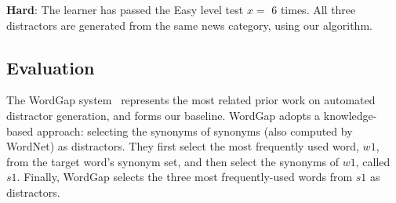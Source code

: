 {\bf Hard}: The learner has passed the Easy level test $x=$ 6
times.  All three distractors are generated from the same news
category, using our algorithm.


\subsection{Evaluation}

The WordGap system~\cite{Knoop2013} represents the most related prior
work on automated distractor generation, and forms our
baseline. WordGap adopts a knowledge-based approach: selecting the
synonyms of synonyms (also computed by WordNet) as distractors.  They
first select the most frequently used word, $w1$, from the target
word's synonym set, and 
then select the synonyms of $w1$, called $s1$.  Finally, WordGap
selects the three most frequently-used words from $s1$ as
distractors.

%


